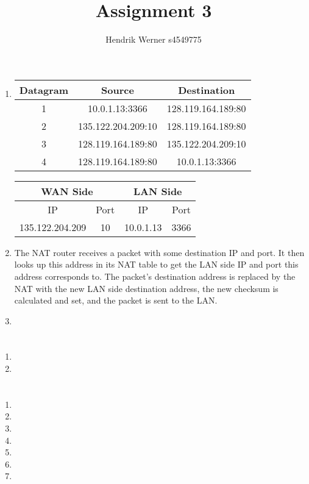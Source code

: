 \documentclass[12pt, a4paper]{article}
\title{Assignment 3}
\author{Hendrik Werner s4549775}
\begin{document}
\maketitle

\section{} %
\begin{enumerate}[a]
	\item %
	\begin{tabular}{|c|c|c|}
		\hline
		Datagram & Source & Destination\\\hline
		1 & 10.0.1.13:3366 & 128.119.164.189:80\\
		2 & 135.122.204.209:10 & 128.119.164.189:80\\
		3 & 128.119.164.189:80 & 135.122.204.209:10\\
		4 & 128.119.164.189:80 & 10.0.1.13:3366\\
		\hline
	\end{tabular}

	\begin{tabular}{|c|c|c|c|}
		\hline
		\multicolumn{2}{|c|}{WAN Side} & \multicolumn{2}{|c|}{LAN Side}\\\hline
		IP & Port & IP & Port\\\hline
		135.122.204.209 & 10 & 10.0.1.13 & 3366\\
		\hline
	\end{tabular}

	\item %
	The NAT router receives a packet with some destination IP and port. It then looks up this address in its NAT table to get the LAN side IP and port this address corresponds to. The packet's destination address is replaced by the NAT with the new LAN side destination address, the new checksum is calculated and set, and the packet is sent to the LAN.

	\item %
\end{enumerate}

\section{} %
\begin{enumerate}[a]
	\item %
	\item %
\end{enumerate}

\section{} %
\begin{enumerate}[1]
	\item %
	\item %
	\item %
	\item %
	\item %
	\item %
	\item %
\end{enumerate}
\end{document}
